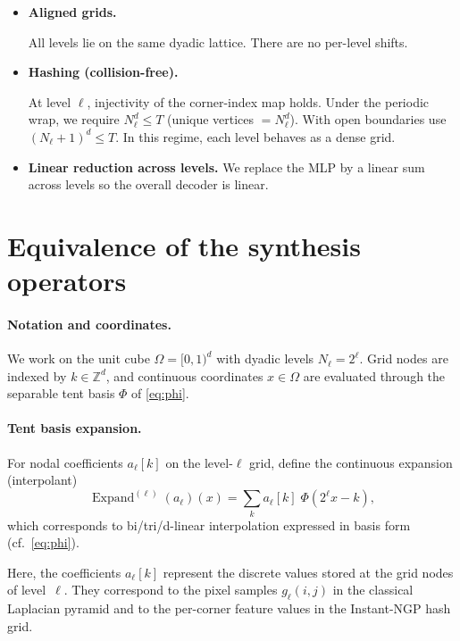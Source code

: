 \documentclass[a4paper,11pt,oneside]{article}
\numberwithin{equation}{section}
\begin{document}
\begin{itemize}
\item \textbf{Aligned grids.}

All levels lie on the same dyadic lattice. There are no per-level shifts.

\item \textbf{Hashing (collision-free).}

At level \(\ell\), injectivity of the corner-index map holds. Under the periodic wrap, we require \(N_\ell^d \le T\) (unique vertices \(=N_\ell^d\)). With open boundaries use \((N_\ell+1)^d \le T\).
In this regime, each level behaves as a dense grid.

\item \textbf{Linear reduction across levels.}
We replace the MLP by a linear sum across levels so the overall decoder is linear.
\end{itemize}

\section{Equivalence of the synthesis operators}

\paragraph{Notation and coordinates.}
We work on the unit cube $\Omega=[0,1)^d$ with dyadic levels
$N_\ell=2^\ell$. Grid nodes are indexed by
$k\in\mathbb{Z}^d$, and continuous coordinates
$x\in\Omega$ are evaluated through the separable tent
basis $\Phi$ of \cref{eq:phi}.

\paragraph{Tent basis expansion.}

For nodal coefficients \(a_\ell[k]\) on the level-\(\ell\) grid, define the continuous expansion (interpolant)
\begin{equation}
\label{eq:expand-ell}
\operatorname{Expand}^{(\ell)}(a_\ell)(x)
=\sum_{k} a_\ell[k]\;\Phi(2^\ell x-k),
\end{equation}
which corresponds to bi/tri/d-linear interpolation expressed in basis form (cf.\ \cref{eq:phi}).

Here, the coefficients \(a_\ell[k]\) represent the discrete values stored at the grid nodes of level~\(\ell\). They correspond to the pixel samples \(g_\ell(i,j)\) in the classical Laplacian pyramid and to the per-corner feature values in the Instant-NGP hash grid.
\end{document}
